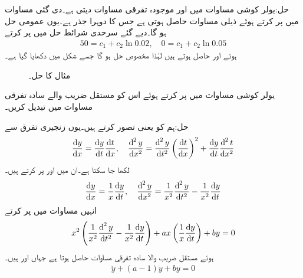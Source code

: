 حل:یولر کوشی مساوات میں  اور  موجودہ تفرقی مساوات دیتی ہے۔دی گئی مساوات میں  پر کرتے ہوئے ذیلی مساوات  حاصل ہوتی ہے جس کا دوہرا جذر  ہے۔یوں عمومی  حل  ہو گا۔دیے گئے سرحدی شرائط حل میں پر کرتے 
\begin{align*}
50=c_1+c_2\ln 0.02, \quad 0=c_1+c_2\ln 0.05
\end{align*}
ہوئے  اور  حاصل ہوتے ہیں لہٰذا مخصوص حل  ہو گا جسے شکل  میں دکھایا گیا ہے۔
\begin{figure}
\centering
{}
\caption{مثال  کا حل۔}
\label{شکل_مثال_سادہ_دو_ہم_محوری_نلکی_میدان}
\end{figure}
یولر کوشی مساوات  میں  پر کرتے ہوئے اس کو مستقل  ضریب  والے سادہ تفرقی مساوات میں تبدیل کریں۔

حل:ہم  کو  یعنی  تصور کرتے ہیں۔یوں زنجیری تفرق سے
\begin{align*}
\frac{\dif y}{\dif x}=\frac{\dif y}{\dif t}\frac{\dif t}{\dif x}, \quad \frac{\dif^{\,2} y}{\dif x^2}=\frac{\dif^{\,2}y}{\dif t^2}\left(\frac{\dif t}{\dif x}\right)^2+\frac{\dif y}{\dif t}\frac{\dif^{\,2} t}{\dif x^2}
\end{align*}
لکھا جا سکتا ہے۔ان میں  اور  پر کرتے ہیں۔
\begin{align*}
\frac{\dif y}{\dif x}=\frac{1}{x}\frac{\dif y}{\dif t}, \quad \frac{\dif^{\,2} y}{\dif x^2}=\frac{1}{x^2}\frac{\dif^{\,2}y}{\dif t^2}-\frac{1}{x^2}\frac{\dif y}{\dif t}
\end{align*}
انہیں مساوات  میں پر کرتے 
\begin{align*}
x^2\left(\frac{1}{x^2}\frac{\dif^{\,2}y}{\dif t^2}-\frac{1}{x^2}\frac{\dif y}{\dif t}\right)+ax\left(\frac{1}{x}\frac{\dif y}{\dif t}\right)+by=0
\end{align*}
ہوئے مستقل  ضریب  والا سادہ تفرقی مساوات حاصل ہوتا ہے  جہاں  اور  ہیں۔
\begin{align}
\ddot{y}+(a-1)\dot{y}+by=0
\end{align}

